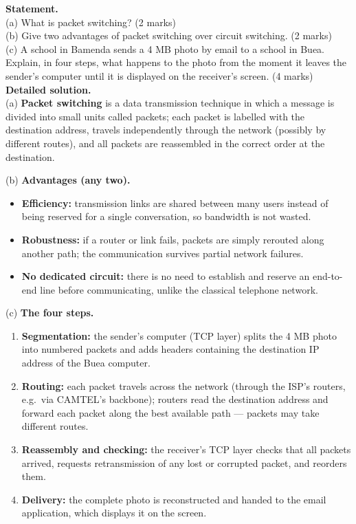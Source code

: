 \documentclass[11pt]{article}
\begin{document}
\begin{exoresolu}
\textbf{Statement.}\\
(a) What is packet switching? \hfill (2 marks)\\
(b) Give two advantages of packet switching over circuit switching. \hfill (2 marks)\\
(c) A school in Bamenda sends a 4 MB photo by email to a school in Buea. Explain, in four steps, what happens to the photo from the moment it leaves the sender's computer until it is displayed on the receiver's screen. \hfill (4 marks)
\tcblower
\textbf{Detailed solution.}\\
(a) \textbf{Packet switching} is a data transmission technique in which a message is divided into small units called packets; each packet is labelled with the destination address, travels independently through the network (possibly by different routes), and all packets are reassembled in the correct order at the destination.

(b) \textbf{Advantages (any two).}
\begin{itemize}
\item \textbf{Efficiency:} transmission links are shared between many users instead of being reserved for a single conversation, so bandwidth is not wasted.
\item \textbf{Robustness:} if a router or link fails, packets are simply rerouted along another path; the communication survives partial network failures.
\item \textbf{No dedicated circuit:} there is no need to establish and reserve an end-to-end line before communicating, unlike the classical telephone network.
\end{itemize}

(c) \textbf{The four steps.}
\begin{enumerate}
\item \textbf{Segmentation:} the sender's computer (TCP layer) splits the 4 MB photo into numbered packets and adds headers containing the destination IP address of the Buea computer.
\item \textbf{Routing:} each packet travels across the network (through the ISP's routers, e.g.\ via CAMTEL's backbone); routers read the destination address and forward each packet along the best available path — packets may take different routes.
\item \textbf{Reassembly and checking:} the receiver's TCP layer checks that all packets arrived, requests retransmission of any lost or corrupted packet, and reorders them.
\item \textbf{Delivery:} the complete photo is reconstructed and handed to the email application, which displays it on the screen.
\end{enumerate}
\end{exoresolu}
\end{document}
